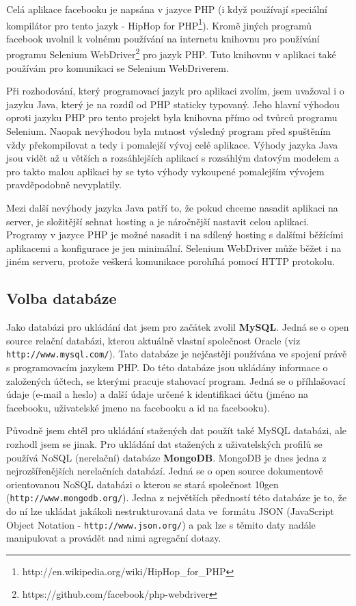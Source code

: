 \documentclass[thesis=M,czech]{FITthesis}[2013/05/10]
\begin{document}
Celá aplikace facebooku je napsána v jazyce PHP (i když používají speciální kompilátor pro tento jazyk - HipHop for PHP\footnote{http://en.wikipedia.org/wiki/HipHop\_for\_PHP}). Kromě jiných programů facebook uvolnil k volnému používání na internetu knihovnu pro používání programu Selenium WebDriver\footnote{https://github.com/facebook/php-webdriver} pro jazyk PHP. Tuto knihovnu v aplikaci také používám pro komunikaci se Selenium WebDriverem.

Při rozhodování, který programovací jazyk pro aplikaci zvolím, jsem uvažoval i o jazyku Java, který je na rozdíl od PHP staticky typovaný. Jeho hlavní výhodou oproti jazyku PHP pro tento projekt byla knihovna přímo od tvůrců programu Selenium. Naopak nevýhodou byla nutnost výsledný program před spuštěním vždy překompilovat a tedy i pomalejší vývoj celé aplikace. Výhody jazyka Java jsou vidět až u větších a rozsáhlejších aplikací s rozsáhlým datovým modelem a pro takto malou aplikaci by se tyto výhody vykoupené pomalejším vývojem pravděpodobně nevyplatily. 

Mezi další nevýhody jazyka Java patří to, že pokud chceme nasadit aplikaci na server, je složitější sehnat hosting a je náročnější nastavit celou aplikaci. Programy v jazyce PHP je možné nasadit i na sdílený hosting s dalšími běžícími aplikacemi a konfigurace je jen minimální. Selenium WebDriver může běžet i na jiném serveru, protože veškerá komunikace porohíhá pomocí HTTP protokolu.

\subsection{Volba databáze}

Jako databázi pro ukládání dat jsem pro začátek zvolil \textbf{MySQL}. Jedná se o open source relační databázi, kterou aktuálně vlastní společnost Oracle (viz \verb|http://www.mysql.com/|). Tato databáze je nejčastěji používána ve spojení právě s programovacím jazykem PHP. Do této databáze jsou ukládány informace o založených účtech, se kterými pracuje stahovací program. Jedná se o příhlašovací údaje (e-mail a heslo) a další údaje určené k identifikaci účtu (jméno na facebooku, uživatelské jmeno na facebooku a id na facebooku).

Původně jsem chtěl pro ukládání stažených dat použít také MySQL databázi, ale rozhodl jsem se jinak. Pro ukládání dat stažených z uživatelských profilů se používá NoSQL (nerelační) databáze \textbf{MongoDB}. MongoDB je dnes jedna z nejrozšířenějších nerelačních databází. Jedná se o open source dokumentově orientovanou NoSQL databázi o kterou se stará společnost 10gen (\verb|http://www.mongodb.org/|). Jedna z největších předností této databáze je to, že do ní lze ukládat jakákoli nestrukturovaná data ve~formátu JSON (JavaScript Object Notation - \verb|http://www.json.org/|) a pak lze s těmito daty nadále manipulovat a provádět nad nimi agregační dotazy. 
\end{document}
